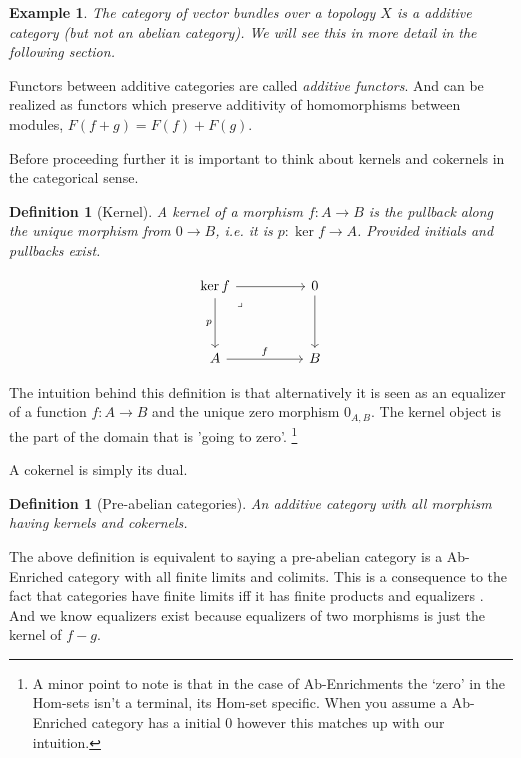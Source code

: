 \documentclass[12pt]{article}
\numberwithin{equation}{section}
\newcounter{dummy} \numberwithin{dummy}{section}
\newtheorem{definition}[dummy]{Definition}
\newtheorem{example}[dummy]{Example}
\begin{document}
	\begin{example}
		The category of vector bundles over a topology $X$ is a additive category (but not an abelian category). We will see this in more detail in the following section.
	\end{example}
	Functors between additive categories are called \textit{additive functors}. And can be realized as functors which preserve additivity of homomorphisms between modules, $F(f+g)=F(f)+F(g).$
	
	Before proceeding further it is important to think about kernels and cokernels in the categorical sense.
	\begin{definition}[Kernel]
		A kernel of a morphism $f:A \to B$ is the pullback along the unique morphism from $0 \to B$, i.e. it is $p: \ker f \to A$. Provided initials and pullbacks exist.
		
		\[\begin{tikzcd}
			{\ker f} && 0 \\
			\\
			A && B
			\arrow["f", from=3-1, to=3-3]
			\arrow[from=1-3, to=3-3]
			\arrow[from=1-1, to=1-3]
			\arrow["p"',from=1-1, to=3-1]
			\arrow["\lrcorner"{anchor=center, pos=0.125}, draw=none, from=1-1, to=3-3]
		\end{tikzcd}\]
	\end{definition}
	The intuition behind this definition is that alternatively it is seen as an equalizer of a function $f:A \to B$ and the unique zero morphism $0_{A,B}$. The kernel object is the part of the domain that is 'going to zero'. \footnote{A minor point to note is that in the case of Ab-Enrichments the `zero' in the Hom-sets isn't a terminal, its Hom-set specific. When you assume a Ab-Enriched category has a initial 0 however this matches up with our intuition.}
	
	A cokernel is simply its dual.
	
	\begin{definition}[Pre-abelian categories]
		An additive category with all morphism having kernels and cokernels.
	\end{definition}
	The above definition is equivalent to saying a pre-abelian category is a Ab-Enriched category with all finite limits and colimits. This is a consequence to the fact that categories have finite limits iff it has finite products and equalizers \cite[Prop.~5.21]{Awodey}. And we know equalizers exist because equalizers of two morphisms is just the kernel of $f-g$.
	
	
	
\end{document}
